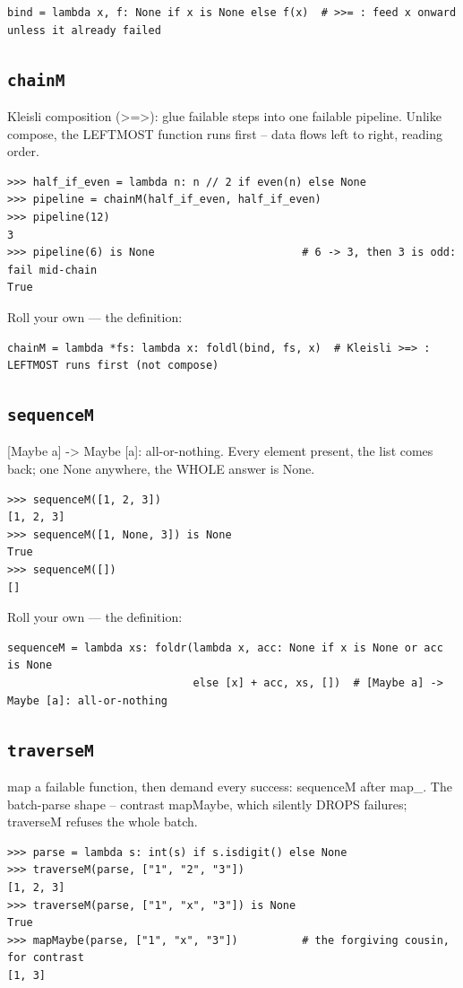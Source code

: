 \documentclass[10pt,letterpaper]{book}
\begin{document}
\begin{lstlisting}[style=ex]
bind = lambda x, f: None if x is None else f(x)  # >>= : feed x onward unless it already failed
\end{lstlisting}
\subsection{\texttt{chainM}}\label{def:chainM}
Kleisli composition (>=>): glue failable steps into one failable pipeline. Unlike compose, the LEFTMOST function runs first -- data flows left to right, reading order.
\begin{lstlisting}[style=ex]
>>> half_if_even = lambda n: n // 2 if even(n) else None
>>> pipeline = chainM(half_if_even, half_if_even)
>>> pipeline(12)
3
>>> pipeline(6) is None                       # 6 -> 3, then 3 is odd: fail mid-chain
True
\end{lstlisting}

Roll your own --- the definition:

\begin{lstlisting}[style=ex]
chainM = lambda *fs: lambda x: foldl(bind, fs, x)  # Kleisli >=> : LEFTMOST runs first (not compose)
\end{lstlisting}
\subsection{\texttt{sequenceM}}\label{def:sequenceM}
[Maybe a] -> Maybe [a]: all-or-nothing. Every element present, the list comes back; one None anywhere, the WHOLE answer is None.
\begin{lstlisting}[style=ex]
>>> sequenceM([1, 2, 3])
[1, 2, 3]
>>> sequenceM([1, None, 3]) is None
True
>>> sequenceM([])
[]
\end{lstlisting}

Roll your own --- the definition:

\begin{lstlisting}[style=ex]
sequenceM = lambda xs: foldr(lambda x, acc: None if x is None or acc is None
                             else [x] + acc, xs, [])  # [Maybe a] -> Maybe [a]: all-or-nothing
\end{lstlisting}
\subsection{\texttt{traverseM}}\label{def:traverseM}
map a failable function, then demand every success: sequenceM after map\_. The batch-parse shape -- contrast mapMaybe, which silently DROPS failures; traverseM refuses the whole batch.
\begin{lstlisting}[style=ex]
>>> parse = lambda s: int(s) if s.isdigit() else None
>>> traverseM(parse, ["1", "2", "3"])
[1, 2, 3]
>>> traverseM(parse, ["1", "x", "3"]) is None
True
>>> mapMaybe(parse, ["1", "x", "3"])          # the forgiving cousin, for contrast
[1, 3]
\end{lstlisting}
\end{document}
